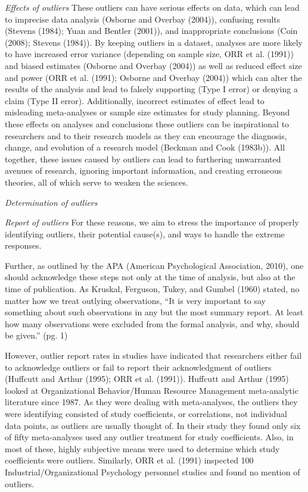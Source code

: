 \documentclass[english,man]{apa6}
\theoremstyle{definition}
\theoremstyle{definition}
\theoremstyle{definition}
\theoremstyle{remark}
\begin{document}
\emph{Effects of outliers} These outliers can have serious effects on
data, which can lead to imprecise data analysis (Osborne and Overbay
(2004)), confusing results (Stevens (1984); Yuan and Bentler (2001)),
and inappropriate conclusions (Coin (2008); Stevens (1984)). By keeping
outliers in a dataset, analyses are more likely to have increased error
variance (depending on sample size, ORR et al. (1991)) and biased
estimates (Osborne and Overbay (2004)) as well as reduced effect size
and power (ORR et al. (1991); Osborne and Overbay (2004)) which can
alter the results of the analysis and lead to falsely supporting (Type I
error) or denying a claim (Type II error). Additionally, incorrect
estimates of effect lead to misleading meta-analyses or sample size
estimates for study planning. Beyond these effects on analyses and
conclusions these outliers can be inspirational to researchers and to
their research models as they can encourage the diagnosis, change, and
evolution of a research model (Beckman and Cook (1983b)). All together,
these issues caused by outliers can lead to furthering unwarranted
avenues of research, ignoring important information, and creating
erroneous theories, all of which serve to weaken the sciences.

\emph{Determination of outliers}

\emph{Report of outliers} For these reasons, we aim to stress the
importance of properly identifying outliers, their potential cause(s),
and ways to handle the extreme responses.

Further, as outlined by the APA (American Psychological Association,
2010), one should acknowledge these steps not only at the time of
analysis, but also at the time of publication. As Kruskal, Ferguson,
Tukey, and Gumbel (1960) stated, no matter how we treat outlying
observations, \enquote{It is very important to say something about such
observations in any but the most summary report. At least how many
observations were excluded from the formal analysis, and why, should be
given.} (pg. 1)

However, outlier report rates in studies have indicated that researchers
either fail to acknowledge outliers or fail to report their
acknowledgment of outliers (Huffcutt and Arthur (1995); ORR et al.
(1991)). Huffcutt and Arthur (1995) looked at Organizational
Behavior/Human Resource Management meta-analytic literature since 1987.
As they were dealing with meta-analyses, the outliers they were
identifying consisted of study coefficients, or correlations, not
individual data points, as outliers are usually thought of. In their
study they found only six of fifty meta-analyses used any outlier
treatment for study coefficients. Also, in most of these, highly
subjective means were used to determine which study coefficients were
outliers. Similarly, ORR et al. (1991) inspected 100
Industrial/Organizational Psychology personnel studies and found no
mention of outliers.
\end{document}
